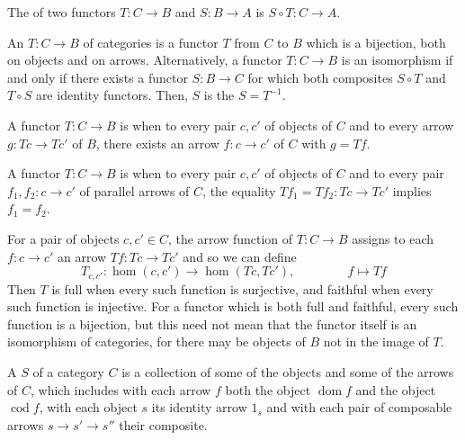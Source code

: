 \documentclass{mathnotes}
\DeclareMathOperator{\dom}{dom}
\DeclareMathOperator{\cod}{cod}
\begin{document}
\begin{defi}
    The  of two functors $T:C\rightarrow B$ and
    $S:B\rightarrow A$ is $S\circ T:C\rightarrow A$.
\end{defi}

\begin{defi}
    An  $T:C\rightarrow B$ of categories is a functor $T$
    from $C$ to $B$ which is a bijection, both on objects and on arrows.
    Alternatively, a functor $T:C\rightarrow B$ is an isomorphism if and only
    if there exists a functor $S:B\rightarrow C$ for which both composites
    $S\circ T$ and $T\circ S$ are identity functors. Then, $S$ is the
     $S=T^{-1}$.
\end{defi}

\begin{defi}
    A functor $T:C\rightarrow B$ is  when to every pair $c, c'$ of
    objects of $C$ and to every arrow $g:Tc\rightarrow Tc'$ of $B$, there
    exists an arrow $f:c\rightarrow c'$ of $C$ with $g=Tf$.
\end{defi}

\begin{defi}
    A functor $T:C\rightarrow B$ is  when to every pair $c,
    c'$ of objects of $C$ and to every pair $f_1,f_2:c\rightarrow c'$ of
    parallel arrows of $C$, the equality $Tf_1=Tf_2:Tc\rightarrow Tc'$ implies
    $f_1=f_2$.
\end{defi}

For a pair of objects $c,c'\in C$, the arrow function of $T:C\rightarrow B$
assigns to each $f:c\rightarrow c'$ an arrow $Tf:Tc\rightarrow Tc'$ and so we
can define
\[T_{c,c'}:\hom(c,c')\rightarrow\hom(Tc,Tc'),\hspace{50pt}f\mapsto Tf\]
Then $T$ is full when every such function is surjective, and faithful when
every such function is injective. For a functor which is both full and
faithful, every such function is a bijection, but this need not mean that the
functor itself is an isomorphism of categories, for there may be objects of $B$
not in the image of $T$.

\begin{defi}
    A  $S$ of a category $C$ is a collection of some of the
    objects and some of the arrows of $C$, which includes with each arrow $f$
    both the object $\dom f$ and the object $\cod f$, with each object $s$
    its identity arrow $1_s$ and with each pair of composable arrows
    $s\rightarrow s'\rightarrow s''$ their composite.
\end{defi}
\end{document}
